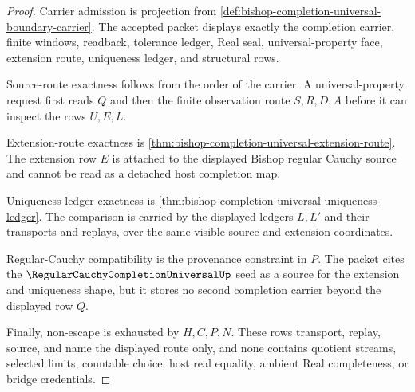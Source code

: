 \begin{proof}
Carrier admission is projection from \autoref{def:bishop-completion-universal-boundary-carrier}. The accepted packet displays exactly the completion carrier, finite windows, readback, tolerance ledger, Real seal, universal-property face, extension route, uniqueness ledger, and structural rows.

Source-route exactness follows from the order of the carrier. A universal-property request first reads $Q$ and then the finite observation route $S,R,D,A$ before it can inspect the rows $U,E,L$.

Extension-route exactness is \autoref{thm:bishop-completion-universal-extension-route}. The extension row $E$ is attached to the displayed Bishop regular Cauchy source and cannot be read as a detached host completion map.

Uniqueness-ledger exactness is \autoref{thm:bishop-completion-universal-uniqueness-ledger}. The comparison is carried by the displayed ledgers $L,L'$ and their transports and replays, over the same visible source and extension coordinates.

Regular-Cauchy compatibility is the provenance constraint in $P$. The packet cites the $\RegularCauchyCompletionUniversalUp$ seed as a source for the extension and uniqueness shape, but it stores no second completion carrier beyond the displayed row $Q$.

Finally, non-escape is exhausted by $H,C,P,N$. These rows transport, replay, source, and name the displayed route only, and none contains quotient streams, selected limits, countable choice, host real equality, ambient Real completeness, or bridge credentials.
\end{proof}


\begin{closurestatus}{\BishopCompletionUniversalBoundaryUp}
  \theoryclosure{\seedClosure}
  \formalstatus{\unformalizedV}
\end{closurestatus}

